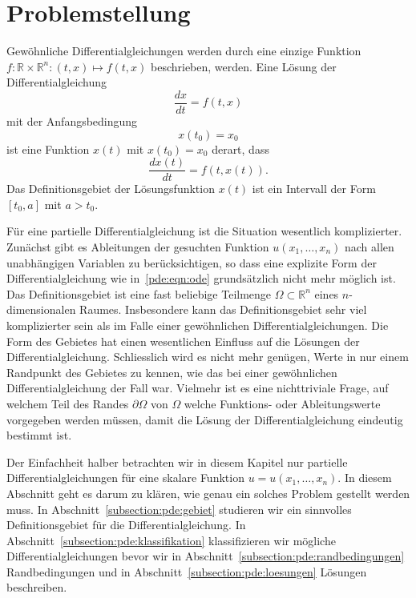 %
%
%
\section{Problemstellung
\label{section:pde:problem}}
%
%
Gewöhnliche Differentialgleichungen werden durch eine einzige Funktion
$f\colon \mathbb R\times\mathbb R^n: (t,x)\mapsto f(t,x)$ beschrieben,
werden.
Eine Lösung der Differentialgleichung
\begin{equation}
\frac{dx}{dt} = f(t,x)
\label{pde:eqn:ode}
\end{equation}
mit der Anfangsbedingung
\[
x(t_0) = x_0
\]
ist eine Funktion $x(t)$ mit $x(t_0)=x_0$ derart, dass 
\[
\frac{dx(t)}{dt} = f(t, x(t)).
\]
Das Definitionsgebiet der Lösungsfunktion $x(t)$ ist ein Intervall
der Form $[t_0,a]$ mit $a>t_0$.
%

Für eine partielle Differentialgleichung ist die Situation wesentlich
komplizierter.
Zunächst gibt es Ableitungen der gesuchten Funktion $u(x_1,\dots,x_n)$
nach allen unabhängigen Variablen zu
berücksichtigen, so dass eine explizite Form der Differentialgleichung
wie in~\eqref{pde:eqn:ode} grundsätzlich nicht mehr möglich ist.
Das Definitionsgebiet ist eine fast beliebige Teilmenge
$\Omega\subset\mathbb R^n$ eines $n$-dimensionalen Raumes.
Insbesondere kann das Definitionsgebiet sehr viel komplizierter sein
als im Falle einer gewöhnlichen Differentialgleichungen.
Die Form des Gebietes hat einen wesentlichen Einfluss auf die Lösungen
der Differentialgleichung.
Schliesslich wird es nicht mehr genügen, Werte in nur einem Randpunkt
des Gebietes zu kennen, wie das bei einer gewöhnlichen Differentialgleichung
der Fall war.
Vielmehr ist es eine nichttriviale Frage, auf welchem Teil des Randes
$\partial\Omega$ von $\Omega$ welche Funktions- oder Ableitungswerte
vorgegeben werden müssen, damit die Lösung der Differentialgleichung
eindeutig bestimmt ist.

Der Einfachheit halber betrachten wir in diesem Kapitel nur partielle
Differentialgleichungen für eine skalare Funktion $u=u(x_1,\dots,x_n)$.
In diesem Abschnitt geht es darum zu klären, wie genau ein solches
Problem gestellt werden muss.
In Abschnitt~\ref{subsection:pde:gebiet} studieren wir ein sinnvolles
Definitionsgebiet für die Differentialgleichung.
In Abschnitt~\ref{subsection:pde:klassifikation} klassifizieren wir
mögliche Differentialgleichungen bevor wir in
Abschnitt~\ref{subsection:pde:randbedingungen} Randbedingungen und
in Abschnitt~\ref{subsection:pde:loesungen} Lösungen beschreiben.

